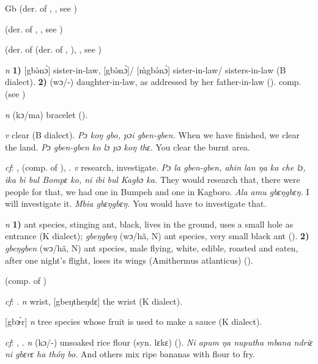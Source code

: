 \begin{letter}{Gb}
 (der. of , , see ) 

 (der. of , , see ) 

 (der. of  (der. of , ), , see ) 

 \textit{n} \textbf{1)} [gbə̀nɔ̀] sister-in-law, [gbə̀nɔ̀]/ [\`{m}gbə́nɔ̀] sister-in-law/ sisters-in-law (B dialect). \textbf{2)} (wɔ/-) daughter-in-law, as addressed by her father-in-law (\citealt{Pichl1967}). comp.  (see ) 

 \textit{n} (kɔ/ma) bracelet (\citealt{Pichl1967}).

 \textit{v} clear (B dialect). \textit{Pɔ koŋ gbo, pɔi gben-gben.} When we have finished, we clear the land. \textit{Pɔ gben-gben ko lɔ pɔ koŋ thɛ.} You clear the burnt area.

 \textit{cf}: ,  (comp. of ), . \textit{v} research, investigate. \textit{Pɔ la gben-gben, ahin lan ŋa ka che lɔ, ika bi bul Bompɛ ko, ni ibi bul Kagbɔ ka.} They would research that, there were people for that, we had one in Bumpeh and one in Kagboro. \textit{Ala amu gbɛŋgbɛŋ.} I will investigate it. \textit{Mbia gbɛŋgbɛŋ.} You would have to investigate that. 

 \textit{n} \textbf{1)} ant species, stinging ant, black, lives in the ground, uses a small hole as entrance (K dialect); \textit{gbeŋgbeŋ} (wɔ/hã, N) ant species, very small black ant (\citealt{Pichl1967}). \textbf{2)} \textit{gbeŋgben} (wɔ/hã, N) ant species, male flying, white, edible, roasted and eaten, after one night's flight, loses its wings (Amithermus atlanticus) (\citealt{Pichl1967}). 

 (comp. of ) 

 \textit{cf}: . \textit{n} wrist, [gbeŋtheŋdɛ] the wrist (K dialect). 

 [gbɝ́r] \textit{n} tree species whose fruit is used to make a sauce (K dialect). 

 \textit{cf}: , . \textit{n} (kɔ/-) unsoaked rice flour (syn. lɛkɛ) (\citealt{Pichl1967}). \textit{Ni apum ŋa nuputha mbana ndriɛ ni gbɛrɛ ha thóŋ bo.} And others mix ripe bananas with flour to fry.


\end{letter}
